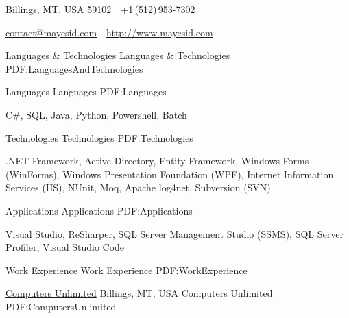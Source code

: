 \documentclass[letterpaper,MMMyyyy,nonstopmode]{simpleresumecv}
\newcommand{\CVAuthor}{Isaac Mayes}
\newcommand{\CVWebpage}{http://www.mayesid.com}
\begin{document}

\Title{\CVAuthor}

\begin{SubTitle}
\href{https://www.google.com/maps/place/Billings,+MT/}
{Billings, MT, USA 59102}
\,\SubBulletSymbol\,
\href{tel:+15129537302}
{+1\,(512)\,953-7302}
\par
\href{mailto:contact@mayesid.com}
{contact@mayesid.com}
\,\SubBulletSymbol\,
\href{\CVWebpage}
{\url{\CVWebpage}}
\end{SubTitle}

\begin{Body}


\Section
{Languages \& \newline Technologies}
{Languages \& Technologies}
{PDF:LanguagesAndTechnologies}

\SubSection
{Languages}
{Languages}
{PDF:Languages}

\BulletItem
C\#, SQL, Java, Python, Powershell, Batch

\Gap

\SubSection
{Technologies}
{Technologies}
{PDF:Technologies}

\BulletItem
.NET Framework, Active Directory, Entity Framework, Windows Forms (WinForms), Windows Presentation Foundation (WPF), Internet Information Services (IIS), NUnit, Moq, Apache log4net, Subversion (SVN)

\Gap

\SubSection
{Applications}
{Applications}
{PDF:Applications}

\BulletItem
Visual Studio, ReSharper, SQL Server Management Studio (SSMS), SQL Server Profiler, Visual Studio Code


\Section
{Work \newline Experience}
{Work Experience}
{PDF:WorkExperience}

\SubSection
{\href{http://www.cu.net}
{Computers Unlimited}
\hfill Billings, MT, USA}
{Computers Unlimited}
{PDF:ComputersUnlimited}

\Gap


\end{Body}
\end{document}
